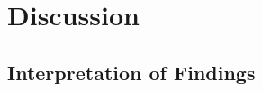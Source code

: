\documentclass[11pt]{article}
\begin{document}


\section{Discussion}\label{sec:discussion}



\subsection{Interpretation of Findings}\label{sec:discussion:interpretation}

\end{document}
